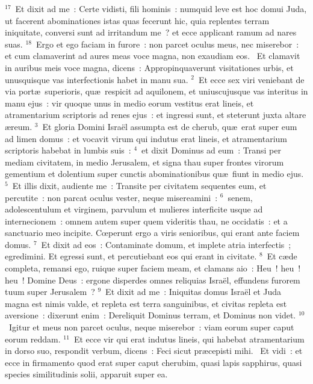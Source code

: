 ${}^{17}$~Et dixit ad me~: Certe vidisti, fili hominis~: numquid leve est hoc domui Juda, ut facerent abominationes istas quas fecerunt hic, quia replentes terram iniquitate, conversi sunt ad irritandum me~? et ecce applicant ramum ad nares suas.
${}^{18}$~Ergo et ego faciam in furore~: non parcet oculus meus, nec miserebor~: et cum clamaverint ad aures meas voce magna, non exaudiam eos.
~Et clamavit in auribus meis voce magna, dicens~: Appropinquaverunt visitationes urbis, et unusquisque vas interfectionis habet in manu sua.
${}^{2}$~Et ecce sex viri veniebant de via port\ae\ superioris, qu\ae\ respicit ad aquilonem, et uniuscujusque vas interitus in manu ejus~: vir quoque unus in medio eorum vestitus erat lineis, et atramentarium scriptoris ad renes ejus~: et ingressi sunt, et steterunt juxta altare \ae reum.
${}^{3}$~Et gloria Domini Isra\"el assumpta est de cherub, qu\ae\ erat super eum ad limen domus~: et vocavit virum qui indutus erat lineis, et atramentarium scriptoris habebat in lumbis suis~:
${}^{4}$~et dixit Dominus ad eum~: Transi per mediam civitatem, in medio Jerusalem, et signa thau super frontes virorum gementium et dolentium super cunctis abominationibus qu\ae\ fiunt in medio ejus.
${}^{5}$~Et illis dixit, audiente me~: Transite per civitatem sequentes eum, et percutite~: non parcat oculus vester, neque misereamini~:
${}^{6}$~senem, adolescentulum et virginem, parvulum et mulieres interficite usque ad internecionem~: omnem autem super quem videritis thau, ne occidatis~: et a sanctuario meo incipite. Cœperunt ergo a viris senioribus, qui erant ante faciem domus.
${}^{7}$~Et dixit ad eos~: Contaminate domum, et implete atria interfectis~; egredimini. Et egressi sunt, et percutiebant eos qui erant in civitate.
${}^{8}$~Et c\ae de completa, remansi ego, ruique super faciem meam, et clamans aio~: Heu~! heu~! heu~! Domine Deus~: ergone disperdes omnes reliquias Isra\"el, effundens furorem tuum super Jerusalem~?
${}^{9}$~Et dixit ad me~: Iniquitas domus Isra\"el et Juda magna est nimis valde, et repleta est terra sanguinibus, et civitas repleta est aversione~: dixerunt enim~: Dereliquit Dominus terram, et Dominus non videt.
${}^{10}$~Igitur et meus non parcet oculus, neque miserebor~: viam eorum super caput eorum reddam.
${}^{11}$~Et ecce vir qui erat indutus lineis, qui habebat atramentarium in dorso suo, respondit verbum, dicens~: Feci sicut pr\ae cepisti mihi.
~Et vidi~: et ecce in firmamento quod erat super caput cherubim, quasi lapis sapphirus, quasi species similitudinis solii, apparuit super ea.
